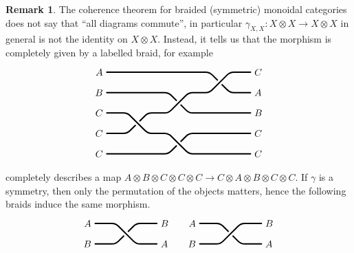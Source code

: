 \documentclass[a4paper,11pt,oneside,openany]{scrbook}
\theoremstyle{definition}
\theoremstyle{definition}
\newtheorem{rmk}[thm]{Remark}
\begin{document}
\begin{rmk}
    The coherence theorem for braided (symmetric) monoidal categories does not say that ``all diagrams commute'', in particular $\gamma_{X,X}\colon X\otimes X\rightarrow X\otimes X$ in general is not the identity on $X\otimes X$. Instead, it tells us that the morphism is completely given by a labelled braid, for example
    \[
    \begin{tikzpicture}
    \draw[line width=0.5mm, cap=round, rounded corners] (0,3) -- node[pos=0, left] {$A$} (3.75,3) -- (4.5,2.25) -- (5.25,2.25) node[pos=1, right] {$A$}; %
    \draw[line width=0.5mm, cap=round, rounded corners] (0,2.25) -- node[pos=0, left] {$B$} (2.25,2.25) -- (3,1.5) -- (5.25,1.5) node[pos=1, right] {$B$}; %
    \draw[line width=2mm, cap=round, rounded corners, color=white] (0,.75) -- (.75,.75) -- (1.5,1.5) -- (2.25,1.5) -- (3,2.25) -- (3.75,2.25) -- (4.5,3) -- (5.25,3) ; %
    \draw[line width=0.5mm, cap=round, rounded corners] (0,.75) -- node[pos=0, left] {$C$} (.75,.75) -- (1.5,1.5) -- (2.25,1.5) -- (3,2.25) -- (3.75,2.25) -- (4.5,3) -- (5.25,3) node[pos=1, right] {$C$}; %
    \draw[line width=0.5mm, cap=round, rounded corners] (0,0) -- node[pos=0, left] {$C$} (2.25,0) -- (3,.75) -- (5.25,.75) node[pos=1, right] {$C$}; %
    \draw[line width=2mm, cap=round, rounded corners, color=white] (0,1.5) -- (.75,1.5) -- (1.5,.75) -- (2.25,.75) -- (3,0) -- (5.25,0); %
    \draw[line width=0.5mm, cap=round, rounded corners] (0,1.5) -- node[pos=0, left] {$C$} (.75,1.5) -- (1.5,.75) -- (2.25,.75) -- (3,0) -- (5.25,0) node[pos=1, right] {$C$}; %
    \end{tikzpicture}
    \]
    completely describes a map $A\otimes B\otimes C\otimes C\otimes C\rightarrow C\otimes A\otimes B\otimes C\otimes C$. If $\gamma$ is a symmetry, then only the permutation of the objects matters, hence the following braids induce the same morphism.
    \[
    \begin{tikzpicture}
    \draw[line width=0.5mm, cap=round, rounded corners] (0,0) -- node[pos=0, left] {$B$} (.75,0) -- (1.5,.75) -- (2.25,.75) node[pos=1, right] {$B$}; %
    \draw[line width=2mm, cap=round, rounded corners, color=white] (0,.75) -- node[pos=0, left] {$A$} (.75,.75) -- (1.5,0) -- (2.25,0) node[pos=1, right] {$A$}; %
    \draw[line width=0.5mm, cap=round, rounded corners] (0,.75) -- node[pos=0, left] {$A$} (.75,.75) -- (1.5,0) -- (2.25,0) node[pos=1, right] {$A$}; %
    \end{tikzpicture}
    \quad
    \begin{tikzpicture}
    \draw[line width=0.5mm, cap=round, rounded corners] (0,.75) -- node[pos=0, left] {$A$} (.75,.75) -- (1.5,0) -- (2.25,0) node[pos=1, right] {$A$}; %
    \draw[line width=2mm, cap=round, rounded corners, color=white] (0,0) -- node[pos=0, left] {$B$} (.75,0) -- (1.5,.75) -- (2.25,.75) node[pos=1, right] {$B$}; %
    \draw[line width=0.5mm, cap=round, rounded corners] (0,0) -- node[pos=0, left] {$B$} (.75,0) -- (1.5,.75) -- (2.25,.75) node[pos=1, right] {$B$}; %
    \end{tikzpicture}
    \]
\end{rmk}
\end{document}
